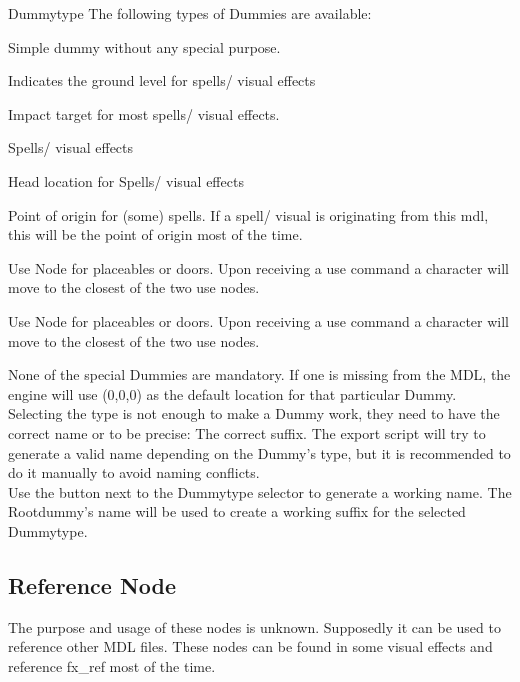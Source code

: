\begin{propertyAurora}{Dummytype}
The following types of Dummies are available:
\begin{description}[leftmargin=6em,style=nextline]
    \item[None] Simple dummy without any special purpose.
    \item[Ground] Indicates the ground level for spells/ visual effects
    \item[Impact] Impact target for most spells/ visual effects.
    \item[Head Hit] Spells/ visual effects
    \item[Head] Head location for Spells/ visual effects
    \item[Hand] Point of origin for (some) spells. If a spell/ visual is originating from this mdl, this will be the point of origin most of the time.
    \item[Use 1] Use Node for placeables or doors. Upon receiving a use command a character will move to the closest of the two use nodes.
    \item[Use 2] Use Node for placeables or doors. Upon receiving a use command a character will move to the closest of the two use nodes.
\end{description}
\end{propertyAurora}
None of the special Dummies are mandatory. If one is
missing from the MDL, the engine will use (0,0,0) as the default location
for that particular Dummy. \\

Selecting the type is not enough to make a Dummy work, they need to have
the correct name or to be precise: The correct suffix.
The export script will try to generate a valid name depending on
the Dummy's type, but it is recommended to do it manually to avoid naming
conflicts. \\

Use the button next to the Dummytype selector to generate a
working name. The Rootdummy's name will be used to create a working
suffix for the selected Dummytype. \\

\subsection{Reference Node}
The purpose and usage of these nodes is unknown. Supposedly it can be used to
reference other MDL files. These nodes can be found in some visual effects and reference fx\_ref 
most of the time.

